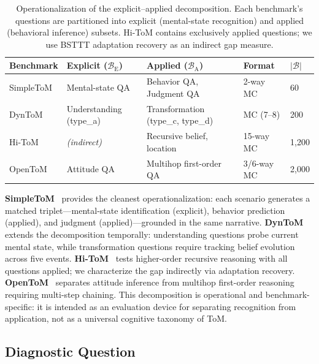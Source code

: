 \documentclass{article}
\begin{document}
\begin{table}[t]
    \caption{Operationalization of the explicit--applied decomposition. Each benchmark's questions are partitioned into explicit (mental-state recognition) and applied (behavioral inference) subsets. Hi-ToM contains exclusively applied questions; we use BSTTT adaptation recovery as an indirect gap measure.}
    \label{tab:gap_operationalization}
    \centering
    \small
    \begin{tabular}{@{}lllll@{}}
        \toprule
        \textbf{Benchmark} & \textbf{Explicit ($\mathcal{B}_\mathrm{E}$)} & \textbf{Applied ($\mathcal{B}_\mathrm{A}$)} & \textbf{Format} & \textbf{$|\mathcal{B}|$} \\
        \midrule
        SimpleToM   & Mental-state QA       & Behavior QA, Judgment QA              & 2-way MC & 60 \\
        DynToM      & Understanding (type\_a) & Transformation (type\_c, type\_d)     & MC (7--8) & 200 \\
        Hi-ToM      & \emph{(indirect)}     & Recursive belief, location             & 15-way MC & 1{,}200 \\
        OpenToM     & Attitude QA           & Multihop first-order QA                & 3/6-way MC & 2{,}000 \\
        \bottomrule
    \end{tabular}
\end{table}

\textbf{SimpleToM}~\citep{gu2024simpletom} provides the cleanest operationalization: each scenario generates a matched triplet---mental-state identification (explicit), behavior prediction (applied), and judgment (applied)---grounded in the same narrative.
\textbf{DynToM}~\citep{xiao-etal-2025-towards} extends the decomposition temporally: understanding questions probe current mental state, while transformation questions require tracking belief evolution across five events.
\textbf{Hi-ToM}~\citep{wu-etal-2023-hi} tests higher-order recursive reasoning with all questions applied; we characterize the gap indirectly via adaptation recovery.
\textbf{OpenToM}~\citep{xu-etal-2024-opentom} separates attitude inference from multihop first-order reasoning requiring multi-step chaining.
This decomposition is operational and benchmark-specific: it is intended as an evaluation device for separating recognition from application, not as a universal cognitive taxonomy of ToM.


\subsection{Diagnostic Question}
\label{sec:diagnostic_question}
\end{document}
